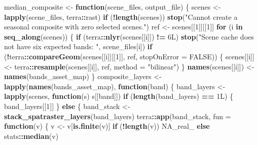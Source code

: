 \documentclass[
]{article}
\newenvironment{Shaded}{\begin{snugshade}}{\end{snugshade}}
\newcommand{\AttributeTok}[1]{\textcolor[rgb]{0.13,0.29,0.53}{#1}}
\newcommand{\ConstantTok}[1]{\textcolor[rgb]{0.56,0.35,0.01}{#1}}
\newcommand{\ControlFlowTok}[1]{\textcolor[rgb]{0.13,0.29,0.53}{\textbf{#1}}}
\newcommand{\DataTypeTok}[1]{\textcolor[rgb]{0.13,0.29,0.53}{#1}}
\newcommand{\DecValTok}[1]{\textcolor[rgb]{0.00,0.00,0.81}{#1}}
\newcommand{\FunctionTok}[1]{\textcolor[rgb]{0.13,0.29,0.53}{\textbf{#1}}}
\newcommand{\NormalTok}[1]{#1}
\newcommand{\OtherTok}[1]{\textcolor[rgb]{0.56,0.35,0.01}{#1}}
\newcommand{\SpecialCharTok}[1]{\textcolor[rgb]{0.81,0.36,0.00}{\textbf{#1}}}
\newcommand{\StringTok}[1]{\textcolor[rgb]{0.31,0.60,0.02}{#1}}
\begin{document}
\begin{Shaded}
\begin{Highlighting}[]
\NormalTok{median\_composite }\OtherTok{\textless{}{-}} \ControlFlowTok{function}\NormalTok{(scene\_files, output\_file) \{}
\NormalTok{  scenes }\OtherTok{\textless{}{-}} \FunctionTok{lapply}\NormalTok{(scene\_files, terra}\SpecialCharTok{::}\NormalTok{rast)}
  \ControlFlowTok{if}\NormalTok{ (}\SpecialCharTok{!}\FunctionTok{length}\NormalTok{(scenes)) }\FunctionTok{stop}\NormalTok{(}\StringTok{"Cannot create a seasonal composite with zero selected scenes."}\NormalTok{)}
\NormalTok{  ref }\OtherTok{\textless{}{-}}\NormalTok{ scenes[[}\DecValTok{1}\NormalTok{]][[}\DecValTok{1}\NormalTok{]]}
  \ControlFlowTok{for}\NormalTok{ (i }\ControlFlowTok{in} \FunctionTok{seq\_along}\NormalTok{(scenes)) \{}
    \ControlFlowTok{if}\NormalTok{ (terra}\SpecialCharTok{::}\FunctionTok{nlyr}\NormalTok{(scenes[[i]]) }\SpecialCharTok{!=} \DecValTok{6}\DataTypeTok{L}\NormalTok{) }\FunctionTok{stop}\NormalTok{(}\StringTok{"Scene cache does not have six expected bands: "}\NormalTok{, scene\_files[i])}
    \ControlFlowTok{if}\NormalTok{ (}\SpecialCharTok{!}\NormalTok{terra}\SpecialCharTok{::}\FunctionTok{compareGeom}\NormalTok{(scenes[[i]][[}\DecValTok{1}\NormalTok{]], ref, }\AttributeTok{stopOnError =} \ConstantTok{FALSE}\NormalTok{)) \{}
\NormalTok{      scenes[[i]] }\OtherTok{\textless{}{-}}\NormalTok{ terra}\SpecialCharTok{::}\FunctionTok{resample}\NormalTok{(scenes[[i]], ref, }\AttributeTok{method =} \StringTok{"bilinear"}\NormalTok{)}
\NormalTok{    \}}
    \FunctionTok{names}\NormalTok{(scenes[[i]]) }\OtherTok{\textless{}{-}} \FunctionTok{names}\NormalTok{(bands\_asset\_map)}
\NormalTok{  \}}
\NormalTok{  composite\_layers }\OtherTok{\textless{}{-}} \FunctionTok{lapply}\NormalTok{(}\FunctionTok{names}\NormalTok{(bands\_asset\_map), }\ControlFlowTok{function}\NormalTok{(band) \{}
\NormalTok{    band\_layers }\OtherTok{\textless{}{-}} \FunctionTok{lapply}\NormalTok{(scenes, }\ControlFlowTok{function}\NormalTok{(s) s[[band]])}
    \ControlFlowTok{if}\NormalTok{ (}\FunctionTok{length}\NormalTok{(band\_layers) }\SpecialCharTok{==} \DecValTok{1}\DataTypeTok{L}\NormalTok{) \{}
\NormalTok{      band\_layers[[}\DecValTok{1}\NormalTok{]]}
\NormalTok{    \} }\ControlFlowTok{else}\NormalTok{ \{}
\NormalTok{      band\_stack }\OtherTok{\textless{}{-}} \FunctionTok{stack\_spatraster\_layers}\NormalTok{(band\_layers)}
\NormalTok{      terra}\SpecialCharTok{::}\FunctionTok{app}\NormalTok{(band\_stack, }\AttributeTok{fun =} \ControlFlowTok{function}\NormalTok{(v) \{}
\NormalTok{        v }\OtherTok{\textless{}{-}}\NormalTok{ v[}\FunctionTok{is.finite}\NormalTok{(v)]}
        \ControlFlowTok{if}\NormalTok{ (}\SpecialCharTok{!}\FunctionTok{length}\NormalTok{(v)) }\ConstantTok{NA\_real\_} \ControlFlowTok{else}\NormalTok{ stats}\SpecialCharTok{::}\FunctionTok{median}\NormalTok{(v)}

\end{Highlighting}
\end{Shaded}
\end{document}

